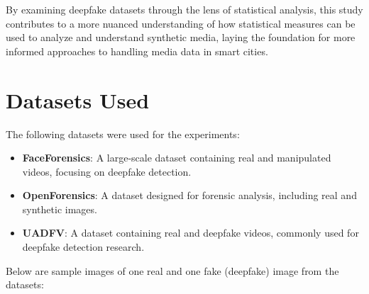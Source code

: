 \documentclass{article}
\begin{document}
By examining deepfake datasets through the lens of statistical analysis, this study contributes to a more nuanced understanding of how statistical measures can be used to analyze and understand synthetic media, laying the foundation for more informed approaches to handling media data in smart cities.

\newpage

\section{Datasets Used}
The following datasets were used for the experiments:

\begin{itemize}
    \item \textbf{FaceForensics}: A large-scale dataset containing real and manipulated videos, focusing on deepfake detection.
    \item \textbf{OpenForensics}: A dataset designed for forensic analysis, including real and synthetic images.
    \item \textbf{UADFV}: A dataset containing real and deepfake videos, commonly used for deepfake detection research.
\end{itemize}

Below are sample images of one real and one fake (deepfake) image from the datasets:
\end{document}

